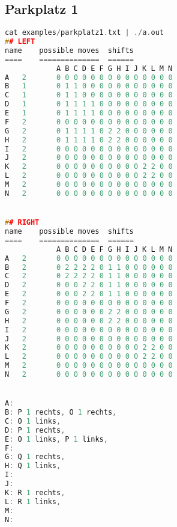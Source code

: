 \documentclass[a4paper,10pt,ngerman]{scrartcl}
\begin{document}
\subsection*{Parkplatz 1}
\begin{lstlisting}[language=C++]
cat examples/parkplatz1.txt | ./a.out
## LEFT
name	possible moves	shifts
====	==============	======
			A B C D E F G H I J K L M N
A	2		0 0 0 0 0 0 0 0 0 0 0 0 0 0
B	1		0 1 1 0 0 0 0 0 0 0 0 0 0 0
C	1		0 1 1 0 0 0 0 0 0 0 0 0 0 0
D	1		0 1 1 1 1 0 0 0 0 0 0 0 0 0
E	1		0 1 1 1 1 0 0 0 0 0 0 0 0 0
F	2		0 0 0 0 0 0 0 0 0 0 0 0 0 0
G	2		0 1 1 1 1 0 2 2 0 0 0 0 0 0
H	2		0 1 1 1 1 0 2 2 0 0 0 0 0 0
I	2		0 0 0 0 0 0 0 0 0 0 0 0 0 0
J	2		0 0 0 0 0 0 0 0 0 0 0 0 0 0
K	2		0 0 0 0 0 0 0 0 0 0 2 2 0 0
L	2		0 0 0 0 0 0 0 0 0 0 2 2 0 0
M	2		0 0 0 0 0 0 0 0 0 0 0 0 0 0
N	2		0 0 0 0 0 0 0 0 0 0 0 0 0 0


## RIGHT
name	possible moves	shifts
====	==============	======
			A B C D E F G H I J K L M N
A	2		0 0 0 0 0 0 0 0 0 0 0 0 0 0
B	2		0 2 2 2 2 0 1 1 0 0 0 0 0 0
C	2		0 2 2 2 2 0 1 1 0 0 0 0 0 0
D	2		0 0 0 2 2 0 1 1 0 0 0 0 0 0
E	2		0 0 0 2 2 0 1 1 0 0 0 0 0 0
F	2		0 0 0 0 0 0 0 0 0 0 0 0 0 0
G	2		0 0 0 0 0 0 2 2 0 0 0 0 0 0
H	2		0 0 0 0 0 0 2 2 0 0 0 0 0 0
I	2		0 0 0 0 0 0 0 0 0 0 0 0 0 0
J	2		0 0 0 0 0 0 0 0 0 0 0 0 0 0
K	2		0 0 0 0 0 0 0 0 0 0 2 2 0 0
L	2		0 0 0 0 0 0 0 0 0 0 2 2 0 0
M	2		0 0 0 0 0 0 0 0 0 0 0 0 0 0
N	2		0 0 0 0 0 0 0 0 0 0 0 0 0 0


A:
B: P 1 rechts, O 1 rechts,
C: O 1 links,
D: P 1 rechts,
E: O 1 links, P 1 links,
F:
G: Q 1 rechts,
H: Q 1 links,
I:
J:
K: R 1 rechts,
L: R 1 links,
M:
N:
\end{lstlisting}
\end{document}
